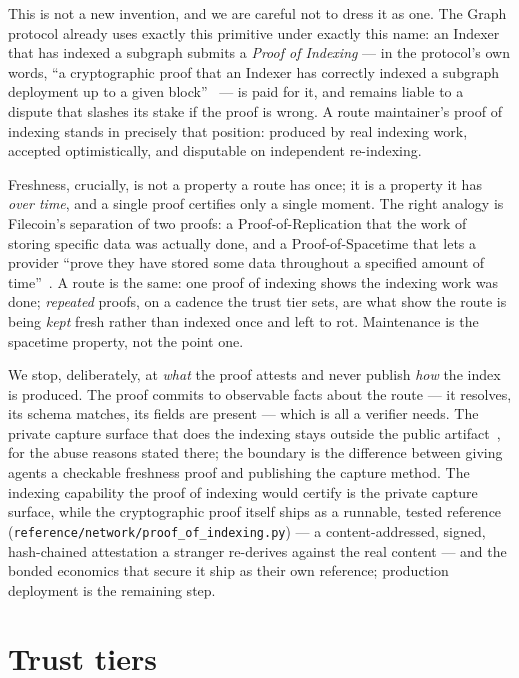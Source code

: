 \documentclass[11pt]{article}
\begin{document}
This is not a new invention, and we are careful not to dress it as one. The Graph
protocol already uses exactly this primitive under exactly this name: an Indexer
that has indexed a subgraph submits a \emph{Proof of Indexing} --- in the protocol's
own words, ``a cryptographic proof that an Indexer has correctly indexed a subgraph
deployment up to a given block''~\cite{thegraph} --- is paid for it, and remains
liable to a dispute that slashes its stake if the proof is wrong. A route
maintainer's proof of indexing stands in precisely that position: produced by real
indexing work, accepted optimistically, and disputable on independent re-indexing.

Freshness, crucially, is not a property a route has once; it is a property it has
\emph{over time}, and a single proof certifies only a single moment. The right
analogy is Filecoin's separation of two proofs: a Proof-of-Replication that the work
of storing specific data was actually done, and a Proof-of-Spacetime that lets a
provider ``prove they have stored some data throughout a specified amount of
time''~\cite{filecoin2017}. A route is the same: one proof of indexing shows the
indexing work was done; \emph{repeated} proofs, on a cadence the trust tier sets,
are what show the route is being \emph{kept} fresh rather than indexed once and left
to rot. Maintenance is the spacetime property, not the point one.

We stop, deliberately, at \emph{what} the proof attests and never publish \emph{how}
the index is produced. The proof commits to observable facts about the route --- it
resolves, its schema matches, its fields are present --- which is all a verifier
needs. The private capture surface that does the indexing stays outside the public
artifact~\cite{ossnotice}, for the abuse reasons stated there; the boundary is the
difference between giving agents a checkable freshness proof and publishing the
capture method. The indexing capability the proof of indexing would certify is the
private capture surface, while
the cryptographic proof itself ships as a runnable, tested reference
(\texttt{reference/network/proof\_of\_indexing.py}) --- a content-addressed, signed,
hash-chained attestation a stranger re-derives against the real content --- and the
bonded economics that secure it ship as their own reference; production deployment
is the remaining step.
\section{Trust tiers}
\end{document}
